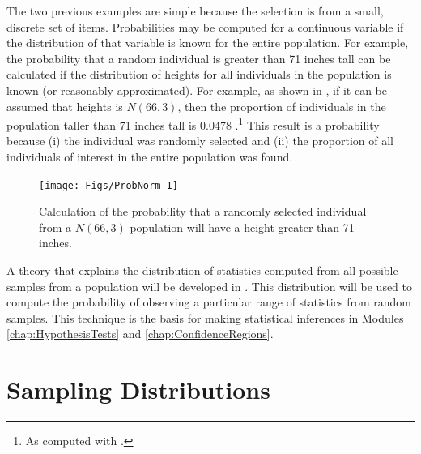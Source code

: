 \documentclass[10pt,openany]{book}\usepackage[]{graphicx}\usepackage[]{color}
\newenvironment{knitrout}{}{} %
\begin{document}
\newpage
The two previous examples are simple because the selection is from a small, discrete set of items. Probabilities may be computed for a continuous variable if the distribution of that variable is known for the entire population. For example, the probability that a random individual is greater than 71 inches tall can be calculated if the distribution of heights for all individuals in the population is known (or reasonably approximated). For example, as shown in , if it can be assumed that heights is $N(66,3)$, then the proportion of individuals in the population taller than 71 inches tall is 0.0478 .\footnote{As computed with .} This result is a probability because (i) the individual was randomly selected and (ii) the proportion of all individuals of interest in the entire population was found.

\begin{knitrout}
\color{fgcolor}\begin{figure}[hbtp]

{\centering \texttt{[image: Figs/ProbNorm-1]} 

}

\caption[Calculation of the probability that a randomly selected individual from a $N(66,3)$ population will have a height greater than 71 inches]{Calculation of the probability that a randomly selected individual from a $N(66,3)$ population will have a height greater than 71 inches.}\label{fig:ProbNorm}
\end{figure}


\end{knitrout}

A theory that explains the distribution of statistics computed from all possible samples from a population will be developed in . This distribution will be used to compute the probability of observing a particular range of statistics from random samples. This technique is the basis for making statistical inferences in Modules \ref{chap:HypothesisTests} and \ref{chap:ConfidenceRegions}.



\chapter{Sampling Distributions} \label{chap:SamplingDist}

\vspace{24pt}
\minitoc
\vspace{36pt}
\end{document}
